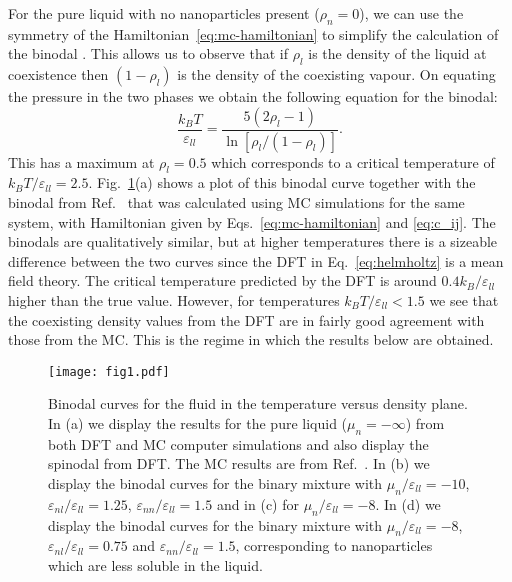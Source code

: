 \documentclass[journal=langd5,manuscript=article]{achemso}
\def\e{\varepsilon}
\begin{document}
For the pure liquid with no nanoparticles present ($\rho_n = 0$), we can
use the symmetry of the Hamiltonian~\eqref{eq:mc-hamiltonian} to
simplify the calculation of the binodal \cite{robbins2011}. This allows
us to observe that if $\rho_l$ is the density of the liquid at
coexistence then $(1-\rho_l)$ is the density of the coexisting vapour.
On equating the pressure in the two phases we obtain the following
equation for the binodal:
%
\begin{equation}
  \frac{k_BT}{\e_{ll}} = \frac{5(2\rho_l - 1)}{\ln[\rho_l/(1-\rho_l)]}.
\end{equation}
%
This has a maximum at $\rho_l = 0.5$ which corresponds to a critical
temperature of $k_BT/\e_{ll} = 2.5$. Fig.~\ref{fig:liquid-binodal}{(a)} shows
a plot of this binodal curve together with the binodal from
Ref.~ that was calculated using MC simulations for
the same system, with Hamiltonian given by Eqs.\ \eqref{eq:mc-hamiltonian} and \eqref{eq:c_ij}. The binodals are qualitatively similar, but at higher temperatures there is a sizeable difference between the two curves since
the DFT in Eq.~\eqref{eq:helmholtz} is a mean field theory. The critical
temperature predicted by the DFT is around $0.4 k_B/\e_{ll}$ higher than
the true value. However, for temperatures $k_BT/\e_{ll} < 1.5$ we see
that the coexisting density values from the DFT are in fairly good
agreement with those from the MC. This is the regime in which the results below are obtained.

\begin{figure}
\centering
  \texttt{[image: fig1.pdf]}
\caption{%
  {Binodal curves for the fluid in the temperature
  versus density plane. In (a) we display the results for the pure
  liquid ($\mu_n=-\infty$) from
  both DFT and MC computer simulations and also
  display the spinodal from DFT. The MC
  results are from Ref.~.
  In (b) we display the binodal curves for the binary mixture
  with $\mu_n/\e_{ll}=-10$,
  $\e_{nl}/\e_{ll}=1.25$, $\e_{nn}/\e_{ll}=1.5$ and
  in (c) for $\mu_n/\e_{ll}=-8$. In 
  (d) we display the binodal curves for the binary mixture with
  $\mu_n/\e_{ll}=-8$, $\e_{nl}/\e_{ll}=0.75$ and $\e_{nn}/\e_{ll}=1.5$,
  corresponding to nanoparticles which are less soluble in the liquid.
  }
}
\label{fig:liquid-binodal}
\end{figure}
\end{document}
